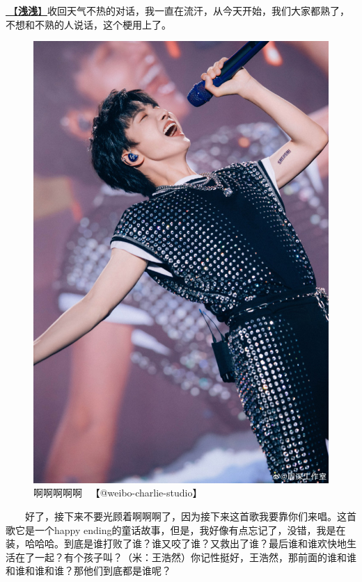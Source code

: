 \documentclass[]{ctexbook}
\begin{document}
\hyperref[qianqian]{🎵【\textbf{浅浅}】}收回天气不热的对话，我一直在流汗，从今天开始，我们大家都熟了，不想和不熟的人说话，这个梗用上了。

\begin{figure}

{\centering \includegraphics[width=400pt]{img/chengdu20240615/004} 

}

\caption{啊啊啊啊啊~ 【@weibo-charlie-studio】}\label{fig:unnamed-chunk-52}
\end{figure}

  好了，接下来不要光顾着啊啊啊了，因为接下来这首歌我要靠你们来唱。这首歌它是一个happy ending的童话故事，但是，我好像有点忘记了，没错，我是在装，哈哈哈。到底是谁打败了谁？谁又咬了谁？又救出了谁？最后谁和谁欢快地生活在了一起？有个孩子叫？（米：王浩然）你记性挺好，王浩然，那前面的谁和谁和谁和谁和谁？那他们到底都是谁呢？
\end{document}
